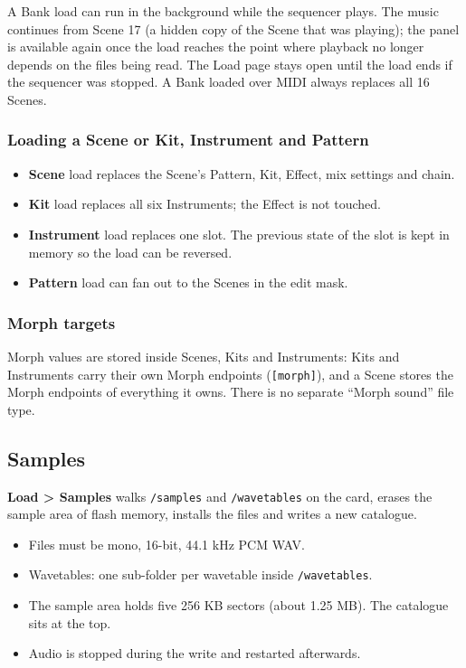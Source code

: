 A Bank load can run in the background while the sequencer plays. The
music continues from Scene 17 (a hidden copy of the Scene that was
playing); the panel is available again once the load reaches the point
where playback no longer depends on the files being read. The Load page
stays open until the load ends if the sequencer was stopped. A Bank
loaded over MIDI always replaces all 16 Scenes.

\subsubsection{Loading a Scene or Kit, Instrument and
Pattern}\label{loading-a-scene-or-kit-instrument-and-pattern}

\begin{itemize}
\tightlist
\item
  \textbf{Scene} load replaces the Scene's Pattern, Kit, Effect, mix
  settings and chain.
\item
  \textbf{Kit} load replaces all six Instruments; the Effect is not
  touched.
\item
  \textbf{Instrument} load replaces one slot. The previous state of the
  slot is kept in memory so the load can be reversed.
\item
  \textbf{Pattern} load can fan out to the Scenes in the edit mask.
\end{itemize}

\subsubsection{Morph targets}\label{morph-targets}

Morph values are stored inside Scenes, Kits and Instruments: Kits and
Instruments carry their own Morph endpoints (\texttt{{[}morph{]}}), and
a Scene stores the Morph endpoints of everything it owns. There is no
separate ``Morph sound'' file type.

\subsection{Samples}\label{samples}

\textbf{Load \textgreater{} Samples} walks \texttt{/samples} and
\texttt{/wavetables} on the card, erases the sample area of flash
memory, installs the files and writes a new catalogue.

\begin{itemize}
\tightlist
\item
  Files must be mono, 16-bit, 44.1 kHz PCM WAV.
\item
  Wavetables: one sub-folder per wavetable inside \texttt{/wavetables}.
\item
  The sample area holds five 256 KB sectors (about 1.25 MB). The
  catalogue sits at the top.
\item
  Audio is stopped during the write and restarted afterwards.
\end{itemize}

